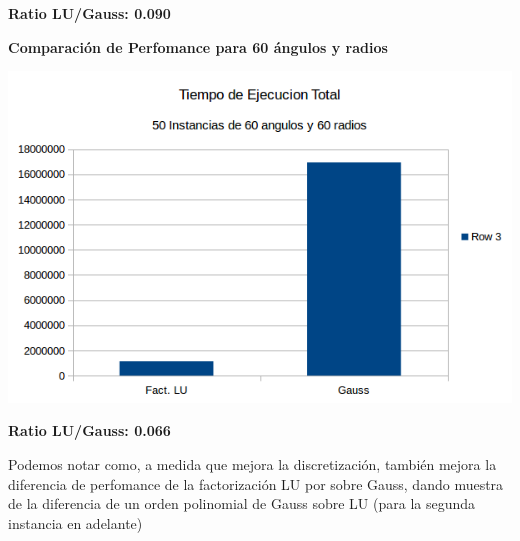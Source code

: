 \textbf{Ratio LU/Gauss: 0.090}

  	\textbf{Comparaci\'on de Perfomance para 60 \'angulos y radios }\\
\begin{center}
\includegraphics[scale=0.7]{experimentos2a_2b/2b6060.png}
\end{center}

 \textbf{Ratio LU/Gauss: 0.066}

Podemos notar como, a medida que mejora la discretizaci\'on, tambi\'en mejora la diferencia de perfomance de la factorizaci\'on LU por sobre Gauss, dando muestra de la diferencia de un orden polinomial de Gauss sobre LU (para la segunda instancia en adelante)




